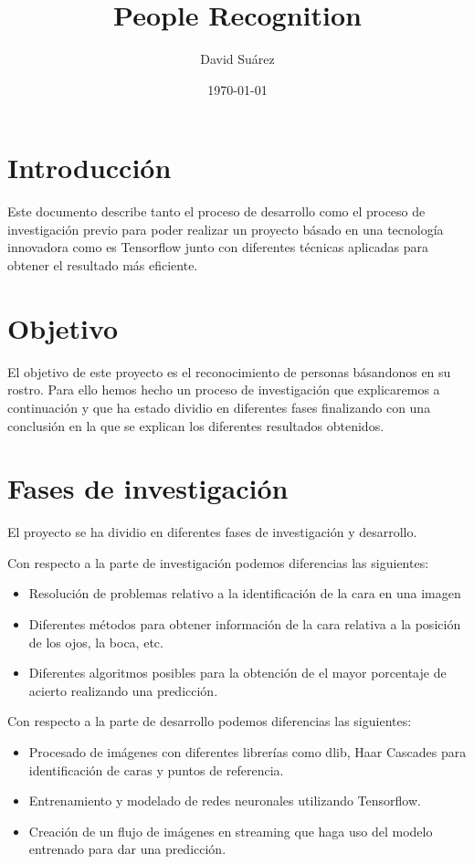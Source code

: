 \documentclass{article}
\title{People Recognition}
\author{David Suárez}
\date{\today}
\begin{document}
\maketitle

\section{Introducción}
Este documento describe tanto el proceso de desarrollo como el proceso de investigación previo para poder realizar un proyecto básado en una tecnología innovadora como es Tensorflow junto con diferentes técnicas aplicadas para obtener el resultado más eficiente.


\section{Objetivo}
El objetivo de este proyecto es el reconocimiento de personas básandonos en su rostro. Para ello hemos hecho un proceso de investigación que explicaremos a continuación y que ha estado dividio en diferentes fases finalizando con una conclusión en la que se explican los diferentes resultados obtenidos.

\section{Fases de investigación}
El proyecto se ha dividio en diferentes fases de investigación y desarrollo.\newline

Con respecto a la parte de investigación podemos diferencias las siguientes:
\begin{itemize}
\item Resolución de problemas relativo a la identificación de la cara en una imagen
\item Diferentes métodos para obtener información de la cara relativa a la posición de los ojos, la boca, etc.
\item Diferentes algoritmos posibles para la obtención de el mayor porcentaje de acierto realizando una predicción.
\end{itemize}

Con respecto a la parte de desarrollo podemos diferencias las siguientes:
\begin{itemize}
\item Procesado de imágenes con diferentes librerías como dlib, Haar Cascades para identificación de caras y puntos de referencia.
\item Entrenamiento y modelado de redes neuronales utilizando Tensorflow.
\item Creación de un flujo de imágenes en streaming que haga uso del modelo entrenado para dar una predicción.
\end{itemize}
\end{document}
